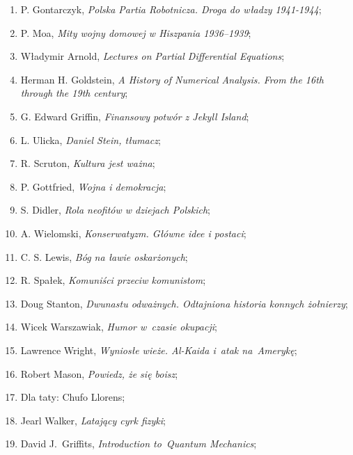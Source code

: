 \documentclass[a4paper,11pt]{article}
\begin{document}
\begin{enumerate}
\item P. Gontarczyk, \emph{Polska Partia Robotnicza. Droga do władzy
    1941-1944};

\item P. Moa, \emph{Mity wojny domowej w Hiszpania 1936--1939};

\item Władymir Arnold, \emph{Lectures on Partial Differential
    Equations};

\item Herman H. Goldstein, \emph{A History of Numerical Analysis. From
    the 16th through the 19th century};

\item G. Edward Griffin, \emph{Finansowy potwór z Jekyll Island};

\item L. Ulicka, \emph{Daniel Stein, tłumacz};

\item R. Scruton, \emph{Kultura jest ważna};

\item P. Gottfried, \emph{Wojna i demokracja};

\item S. Didler, \emph{Rola neofitów w dziejach Polskich};

\item A. Wielomski, \emph{Konserwatyzm. Główne idee i postaci};

\item C. S. Lewis, \emph{Bóg na ławie oskarżonych};

\item R. Spałek, \emph{Komuniści przeciw komunistom};

\item Doug Stanton, \emph{Dwunastu odważnych. Odtajniona historia
    konnych żołnierzy};

\item Wicek Warszawiak, \emph{Humor w~czasie okupacji};

\item Lawrence Wright, \emph{Wyniosłe wieże. Al-Kaida i~atak
    na~Amerykę};

\item Robert Mason, \emph{Powiedz, że się boisz};

\item Dla taty: Chufo Llorens;

\item Jearl Walker, \emph{Latający cyrk fizyki};

\item David J.~Griffits, \emph{Introduction to~Quantum Mechanics};


\end{enumerate}
\end{document}
